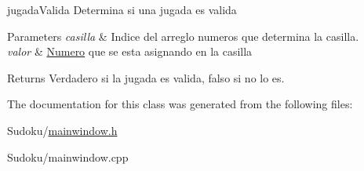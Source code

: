 jugada\-Valida Determina si una jugada es valida 
\begin{DoxyParams}{Parameters}
{\em casilla} & Indice del arreglo numeros que determina la casilla. \\
\hline
{\em valor} & \hyperlink{class_numero}{Numero} que se esta asignando en la casilla \\
\hline
\end{DoxyParams}
\begin{DoxyReturn}{Returns}
Verdadero si la jugada es valida, falso si no lo es. 
\end{DoxyReturn}


The documentation for this class was generated from the following files\-:\begin{DoxyCompactItemize}
\item 
Sudoku/\hyperlink{mainwindow_8h}{mainwindow.\-h}\item 
Sudoku/mainwindow.\-cpp\end{DoxyCompactItemize}
